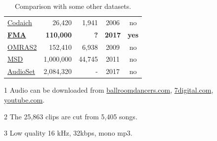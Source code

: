 \documentclass{article}
\newcommand{\todo}[1]{{\color{red} #1 }}
\begin{document}
\begin{table}[t]
\begin{threeparttable}
\begin{tabular}{l@{ }rrcc}
		\href{http://jmir.sourceforge.net/index_Codaich.html}{Codaich} \cite{codaich} & 26,420 & 1,941 & 2006 & no \\ %
		\bf \href{https://github.com/mdeff/fma/}{FMA} & \bf 110,000 & \bf \todo{?} & \bf 2017 & \bf yes \\
		\href{http://www.omras2.org/}{OMRAS2} \cite{omras} & 152,410 & 6,938 & 2009 & no \\
		\href{https://labrosa.ee.columbia.edu/millionsong/}{MSD} \cite{msd} & 1,000,000 & 44,745 & 2011 & no\tnote{1} \\
		\href{https://research.google.com/audioset/}{AudioSet} \cite{audioset} & 2,084,320 & - & 2017 & no\tnote{1} \\
		\bottomrule
	\end{tabular}
	\begin{tablenotes}
		\item[1] Audio can be downloaded from \href{http://www.ballroomdancers.com}{ballroomdancers.com}, \href{https://www.7digital.com}{7digital.com}, \href{https://www.youtube.com}{youtube.com}.
		\item[2] The 25,863 clips are cut from 5,405 songs.
		\item[3] Low quality 16 kHz, 32kbps, mono mp3.
	\end{tablenotes}
	\end{threeparttable}
	\caption{Comparison with some other datasets.} %
	\label{tab:datasets}
\end{table}
\end{document}
